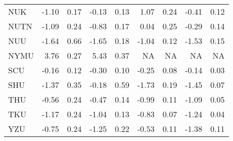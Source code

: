 \begin{longtable}[t]{lrrrrrrrr}
\hspace{1em}NUK & -1.10 & 0.17 & -0.13 & 0.13 & 1.07 & 0.24 & -0.41 & 0.12\\
\hspace{1em}NUTN & -1.09 & 0.24 & -0.83 & 0.17 & 0.04 & 0.25 & -0.29 & 0.14\\
\hspace{1em}NUU & -1.64 & 0.66 & -1.65 & 0.18 & -1.04 & 0.12 & -1.53 & 0.15\\
\hspace{1em}NYMU & 3.76 & 0.27 & 5.43 & 0.37 & NA & NA & NA & NA\\
\hspace{1em}SCU & -0.16 & 0.12 & -0.30 & 0.10 & -0.25 & 0.08 & -0.14 & 0.03\\
\hspace{1em}SHU & -1.37 & 0.35 & -0.18 & 0.59 & -1.73 & 0.19 & -1.45 & 0.07\\
\hspace{1em}THU & -0.56 & 0.24 & -0.47 & 0.14 & -0.99 & 0.11 & -1.09 & 0.05\\
\hspace{1em}TKU & -1.17 & 0.24 & -1.04 & 0.13 & -0.83 & 0.07 & -1.24 & 0.04\\
\hspace{1em}YZU & -0.75 & 0.24 & -1.25 & 0.22 & -0.53 & 0.11 & -1.38 & 0.11\\*
\end{longtable}
